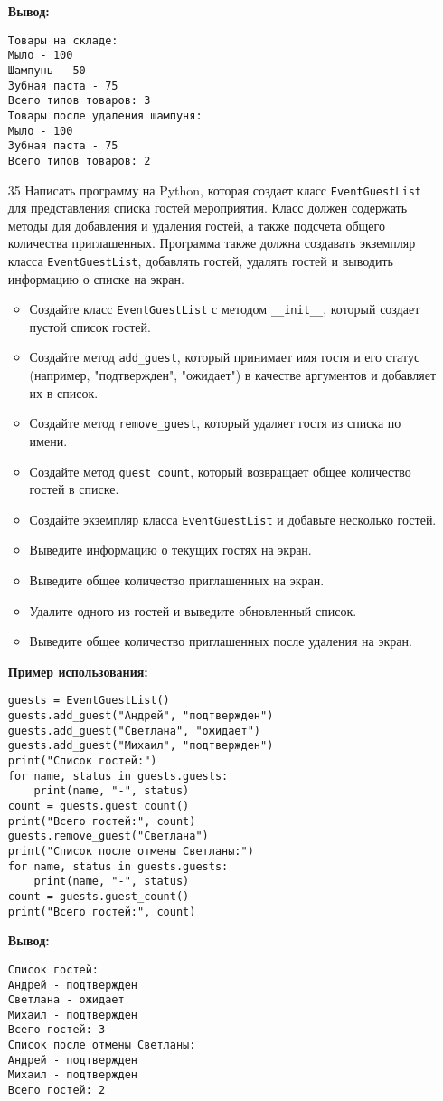 \begin{enumerate}
\textbf{Вывод:}
\begin{verbatim}
Товары на складе:
Мыло - 100
Шампунь - 50
Зубная паста - 75
Всего типов товаров: 3
Товары после удаления шампуня:
Мыло - 100
Зубная паста - 75
Всего типов товаров: 2
\end{verbatim}

\item[35] Написать программу на Python, которая создает класс \texttt{EventGuestList} для представления списка гостей мероприятия. Класс должен содержать методы для добавления и удаления гостей, а также подсчета общего количества приглашенных. Программа также должна создавать экземпляр класса \texttt{EventGuestList}, добавлять гостей, удалять гостей и выводить информацию о списке на экран.

\begin{itemize}
    \item Создайте класс \texttt{EventGuestList} с методом \texttt{\_\_init\_\_}, который создает пустой список гостей.
    \item Создайте метод \texttt{add\_guest}, который принимает имя гостя и его статус (например, "подтвержден", "ожидает") в качестве аргументов и добавляет их в список.
    \item Создайте метод \texttt{remove\_guest}, который удаляет гостя из списка по имени.
    \item Создайте метод \texttt{guest\_count}, который возвращает общее количество гостей в списке.
    \item Создайте экземпляр класса \texttt{EventGuestList} и добавьте несколько гостей.
    \item Выведите информацию о текущих гостях на экран.
    \item Выведите общее количество приглашенных на экран.
    \item Удалите одного из гостей и выведите обновленный список.
    \item Выведите общее количество приглашенных после удаления на экран.
\end{itemize}

\textbf{Пример использования:}

\begin{verbatim}
guests = EventGuestList()
guests.add_guest("Андрей", "подтвержден")
guests.add_guest("Светлана", "ожидает")
guests.add_guest("Михаил", "подтвержден")
print("Список гостей:")
for name, status in guests.guests:
    print(name, "-", status)
count = guests.guest_count()
print("Всего гостей:", count)
guests.remove_guest("Светлана")
print("Список после отмены Светланы:")
for name, status in guests.guests:
    print(name, "-", status)
count = guests.guest_count()
print("Всего гостей:", count)
\end{verbatim}

\textbf{Вывод:}
\begin{verbatim}
Список гостей:
Андрей - подтвержден
Светлана - ожидает
Михаил - подтвержден
Всего гостей: 3
Список после отмены Светланы:
Андрей - подтвержден
Михаил - подтвержден
Всего гостей: 2
\end{verbatim}
\end{enumerate}